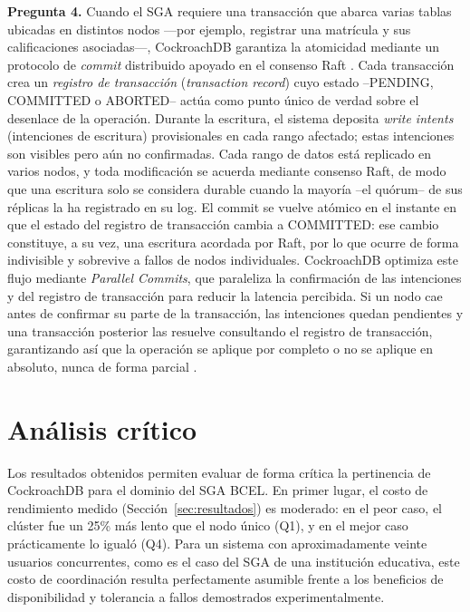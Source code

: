 \documentclass[10pt,a4paper]{article}
\begin{document}
\textbf{Pregunta 4.} Cuando el SGA requiere una transacción que abarca varias tablas
ubicadas en distintos nodos ---por ejemplo, registrar una matrícula y sus
calificaciones asociadas---, CockroachDB garantiza la atomicidad mediante un
protocolo de \emph{commit} distribuido apoyado en el consenso Raft
\cite{ongaro2014,taft2020}. Cada transacción crea un \emph{registro de transacción}
(\emph{transaction record}) cuyo estado --PENDING, COMMITTED o ABORTED-- actúa como
punto único de verdad sobre el desenlace de la operación. Durante la escritura, el
sistema deposita \emph{write intents} (intenciones de escritura) provisionales en cada
rango afectado; estas intenciones son visibles pero aún no confirmadas. Cada rango de
datos está replicado en varios nodos, y toda modificación se acuerda mediante consenso
Raft, de modo que una escritura solo se considera durable cuando la mayoría --el
quórum-- de sus réplicas la ha registrado en su log. El commit se vuelve atómico en el
instante en que el estado del registro de transacción cambia a COMMITTED: ese cambio
constituye, a su vez, una escritura acordada por Raft, por lo que ocurre de forma
indivisible y sobrevive a fallos de nodos individuales. CockroachDB optimiza este
flujo mediante \emph{Parallel Commits}, que paraleliza la confirmación de las
intenciones y del registro de transacción para reducir la latencia percibida. Si un
nodo cae antes de confirmar su parte de la transacción, las intenciones quedan
pendientes y una transacción posterior las resuelve consultando el registro de
transacción, garantizando así que la operación se aplique por completo o no se aplique
en absoluto, nunca de forma parcial \cite{taft2020}.

\section{Análisis crítico}
 
Los resultados obtenidos permiten evaluar de forma crítica la pertinencia
de CockroachDB para el dominio del SGA BCEL. En primer lugar, el costo de
rendimiento medido (Sección~\ref{sec:resultados}) es moderado: en el peor
caso, el clúster fue un 25\% más lento que el nodo único (Q1), y en el
mejor caso prácticamente lo igualó (Q4). Para un sistema con
aproximadamente veinte usuarios concurrentes, como es el caso del SGA de
una institución educativa, este costo de coordinación resulta
perfectamente asumible frente a los beneficios de disponibilidad y
tolerancia a fallos demostrados experimentalmente.
 
\end{document}
